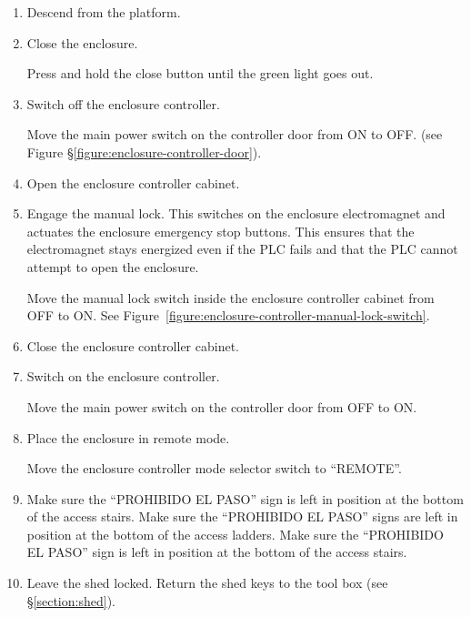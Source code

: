 \begin{enumerate}
        \fi
        \ifquetzalcoatl
        Gather the loose ends of the tarpaulin below and fasten them with a short red cord. See Figure~\ref{figure:tarpaulin}.
        \fi

    \item
        Descend from the platform.

    \item
        Close the enclosure.

        Press and hold the close button until the green light goes out.

    \item
        Switch off the enclosure controller.

        Move the main power switch on the controller door from ON to OFF. (see Figure \S\ref{figure:enclosure-controller-door}).
    \item
        Open the enclosure controller cabinet.

    \item
        Engage the manual lock. This switches on the enclosure electromagnet and actuates the enclosure emergency stop buttons. This ensures that the electromagnet stays energized even if the PLC fails and that the PLC cannot attempt to open the enclosure.

        Move the manual lock switch inside the enclosure controller cabinet from OFF to ON. See Figure~\ref{figure:enclosure-controller-manual-lock-switch}.

    \item
        Close the enclosure controller cabinet.

    \item
        Switch on the enclosure controller.

        Move the main power switch on the controller door from OFF to ON.

    \item
        Place the enclosure in remote mode.

        Move the enclosure controller mode selector switch to “REMOTE”.

    \item
        \ifcoatli
        Make sure the “PROHIBIDO EL PASO” sign is left in position at the bottom of the access stairs.
        \fi
        \ifddoti
        Make sure the “PROHIBIDO EL PASO” signs are left in position at the bottom of the access ladders.
        \fi
        \ifquetzalcoatl
        Make sure the “PROHIBIDO EL PASO” sign is left in position at the bottom of the access stairs.
        \fi

    \item
        Leave the shed locked. Return the shed keys to the tool box (see \S\ref{section:shed}).

\end{enumerate}

